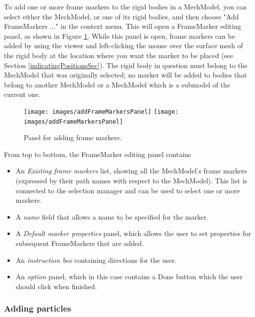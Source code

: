 \documentclass{article}
\begin{document}
To add one or more frame markers to the rigid bodies in a MechModel,
you can select either the MechModel, or one of its rigid
bodies, and then choose {\sf "Add FrameMarkers ..."} in the context
menu. This will open a FrameMarker editing panel, as shown in
Figure \ref{addFrameMarkersPanelFig}. While this panel is open, frame markers can
be added by using the viewer and left-clicking the mouse over the
surface mesh of the rigid body at the location where you want the
marker to be placed (see Section \ref{indicatingPositionsSec}). The rigid body in
question must belong to the MechModel that was originally selected; no
marker will be added to bodies that belong to another MechModel or a
MechModel which is a submodel of the current one.

\begin{figure}
\begin{center}
\iflatexml
\texttt{[image: images/addFrameMarkersPanel]}
\else
\texttt{[image: images/addFrameMarkersPanel]}
\fi
\end{center}
\caption{Panel for adding frame markers.}%
\label{addFrameMarkersPanelFig}
\end{figure}

From top to bottom, the FrameMarker editing panel contains

\begin{itemize}

\item An {\it Existing frame markers} list, showing all the MechModel's frame
markers (expressed by their path names with respect to the
MechModel). This list is connected to the selection manager and can be
used to select one or more markers.

\item A {\it name} field that allows a name to be specified for the marker.

\item A {\it Default marker properties} panel, which
allows the user to set properties for subsequent FrameMarkers that are added.

\item An {\it instruction box} containing directions for the user.

\item An {\it option} panel, which in this case contains a {\sf Done} button which
the user should click when finished.

\end{itemize}

\subsubsection{Adding particles}
\end{document}
